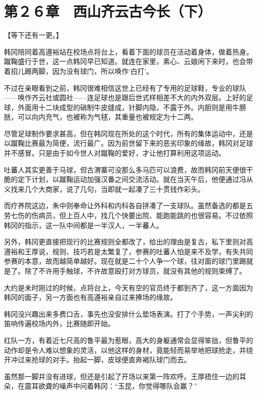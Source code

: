 \section{第２６章　西山齐云古今长（下） }

【等下还有一更。】

韩冈陪同着高遵裕站在校场点将台上，看着下面的球员在活动着身体，做着热身。蹴鞠盛行于世，这一点韩冈早已知道。就连在家里，素心、云娘闲下来时，也会带着招儿踢两脚，因为没有球门，所以唤作‘白打’。

不过在亲眼看到之前，韩冈很难相信这世上已经有了专用的足球鞋，专业的球队——唤作齐云社或圆社——连足球也是跟后世式样相差不大的内外双层。上好的足球，外面用十二块成型的硝制牛皮缝成，针脚内隐，不露于外。内胆则是用牛膀胱，可以向内充气，也被称为气毬，其重量也被规定为十二两。

尽管足球制作要求甚高，但在韩冈现在所处的这个时代，所有的集体运动中，还是以蹴鞠比赛最为简便，流行最广。因为前世留下来的恶劣印象的缘故，韩冈对足球并不感冒。只是由于如今世人对蹴鞠的爱好，才让他打算利用这项运动。

吐蕃人其实更善于马球，但古渭寨可没那么多马匹可以浪费，故而韩冈前天便很干脆的定下计划，以蹴鞠运动加强汉番之间交流活动。就在当天午后，他便通过冯从义找来几个大商家，说了几句，当即就一起凑了三十贯钱作彩头。

而疗养院这边，朱中则奉命让外科和内科各自拼凑了一支球队。虽然备选的都是五劳七伤的伤病员，但上百人中，找几个快要出院、能跑能跳的也很容易。不过依照韩冈的指示，这一队中间都是一半汉人，一半蕃人。

另外，韩冈更直接把现行的比赛规则全都改了，给出的理由是复古，私下里则对高遵裕和王厚说，规则、技巧若是太繁复了，参赛的吐蕃人怕是来不及学，有失共同参赛的本意，故而越简单越好。现在就是二十个人争一个球，往对面的球门里踢就是了。除了不许用手触球，不许故意殴打对方球员，就没有其他的规则束缚了。

大约是未时刚过的时候，点将台上，今天有空的官员终于都到齐了，这一方面因为韩冈的面子，另一方面也有高遵裕亲自过来捧场的缘故。

韩冈没兴趣出来多费口舌，事先也没安排什么垫场表演。打了个手势，一声尖利的笛响传遍校场内外，比赛随即开始。

红队一方，有着近七尺高的鲁平最为惹眼，高大的身躯通常会显得笨拙，但鲁平的动作却是令人难以想象的灵活，以他这样的身材，竟能轻而易举地把球抢走，并绕开冲过来抢球的对手。抬起一脚，皮球便直奔褐队球门而去。

虽然那一脚并没有进球，但还是引起了开场以来第一阵欢呼。王厚捂住一边的耳朵，在震耳欲聋的噪声中问着韩冈：“玉昆，你觉得哪队会赢？”

